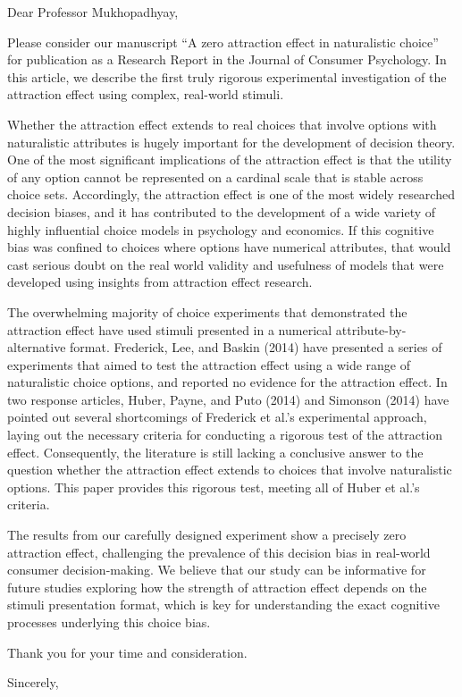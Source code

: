 \documentclass{letter}
\begin{document}
\begin{letter}
{}
\opening{Dear Professor Mukhopadhyay,} %

Please consider our manuscript ``A zero attraction effect in naturalistic choice'' for publication as a Research Report in the Journal of Consumer Psychology. In this article, we describe the first truly rigorous experimental investigation of the attraction effect using complex, real-world stimuli.

Whether the attraction effect extends to real choices that involve options with naturalistic attributes is hugely important for the development of decision theory. One of the most significant implications of the attraction effect is that the utility of any option cannot be represented on a cardinal scale that is stable across choice sets. Accordingly, the attraction effect is one of the most widely researched decision biases, and it has contributed to the development of a wide variety of highly influential choice models in psychology and economics. If this cognitive bias was confined to choices where options have numerical attributes, that would cast serious doubt on the real world validity and usefulness of models that were developed using insights from attraction effect research.

The overwhelming majority of choice experiments that demonstrated the attraction effect have used stimuli presented in a numerical attribute-by-alternative format. Frederick, Lee, and Baskin (2014) have presented a series of experiments that aimed to test the attraction effect using a wide range of naturalistic choice options, and reported no evidence for the attraction effect. In two response articles, Huber, Payne, and Puto (2014) and Simonson (2014) have pointed out several shortcomings of Frederick et al.'s experimental approach, laying out the necessary criteria for conducting a rigorous test of the attraction effect. Consequently, the literature is still lacking a conclusive answer to the question whether the attraction effect extends to choices that involve naturalistic options. This paper provides this rigorous test, meeting all of Huber et al.'s criteria.

The results from our carefully designed experiment show a precisely zero attraction effect, challenging the prevalence of this decision bias in real-world consumer decision-making. We believe that our study can be informative for future studies exploring how the strength of attraction effect depends on the stimuli presentation format, which is key for understanding the exact cognitive processes underlying this choice bias.

Thank you for your time and consideration.

\closing{Sincerely,}



\end{letter}
\end{document}
